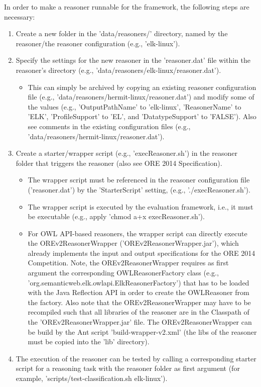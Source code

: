 \documentclass{article}
\begin{document}
In order to make a reasoner runnable for the framework, the following steps are necessary:
\begin{enumerate}
\item Create a new folder in the 'data/reasoners/' directory, named by the reasoner/the reasoner configuration (e.g., 'elk-linux').
\item Specify the settings for the new reasoner in the 'reasoner.dat' file within the reasoner's directory (e.g., 'data/reasoners/elk-linux/reasoner.dat').
\begin{itemize}
\item This can simply be archived by copying an existing reasoner configuration file (e.g., 'data/reasoners/hermit-linux/reasoner.dat') and modify some of the values (e.g., 'OutputPathName' to 'elk-linux', 'ReasonerName' to 'ELK', 'ProfileSupport' to 'EL', and 'DatatypeSupport' to 'FALSE'). Also see comments in the existing configuration files (e.g., 'data/reasoners/hermit-linux/reasoner.dat').
\end{itemize}
\item Create a starter/wrapper script (e.g., 'execReasoner.sh') in the reasoner folder that triggers the reasoner (also see ORE 2014 Specification).
\begin{itemize}
\item The wrapper script must be referenced in the reasoner configuration file ('reasoner.dat') by the 'StarterScript' setting, (e.g., './execReasoner.sh').
\item The wrapper script is executed by the evaluation framework, i.e., it must be executable (e.g., apply 'chmod a+x execReasoner.sh').
\item For OWL API-based reasoners, the wrapper script can directly execute the OREv2ReasonerWrapper ('OREv2ReasonerWrapper.jar'), which already implements the input and output specifications for the ORE 2014 Competition. 
Note, the OREv2ReasonerWrapper requires as first argument the corresponding OWLReasonerFactory class (e.g., 'org.semanticweb.elk.owlapi.ElkReasonerFactory') that has to be loaded with the Java Reflection API in order to create the OWLReasoner from the factory.
Also note that the OREv2ReasonerWrapper may have to be recompiled such that all libraries of the reasoner are in the Classpath of the 'OREv2ReasonerWrapper.jar' file.
The OREv2ReasonerWrapper can be build by the Ant script 'build-wrapper-v2.xml' (the libs of the reasoner must be copied into the 'lib' directory).
\end{itemize}
\item The execution of the reasoner can be tested by calling a corresponding starter script for a reasoning task with the reasoner folder as first argument (for example, 'scripts/test-classification.sh elk-linux').

\end{enumerate}
\end{document}
